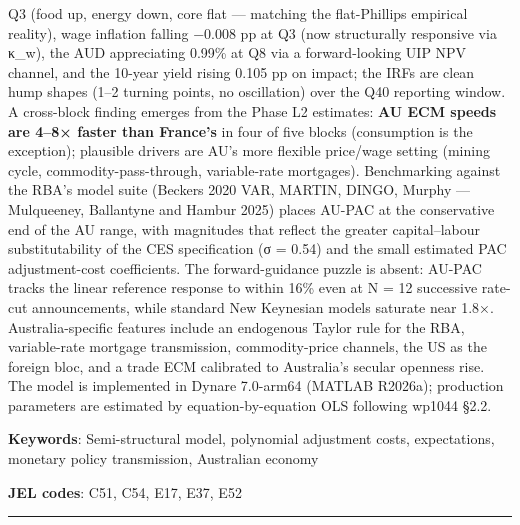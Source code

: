 \documentclass[
]{article}
\begin{document}
Q3 (food up, energy down, core flat --- matching the flat-Phillips
empirical reality), wage inflation falling −0.008 pp at Q3 (now
structurally responsive via κ\_w), the AUD appreciating 0.99\% at Q8 via
a forward-looking UIP NPV channel, and the 10-year yield rising 0.105 pp
on impact; the IRFs are clean hump shapes (1--2 turning points, no
oscillation) over the Q40 reporting window. A cross-block finding
emerges from the Phase L2 estimates: \textbf{AU ECM speeds are 4--8×
faster than France's} in four of five blocks (consumption is the
exception); plausible drivers are AU's more flexible price/wage setting
(mining cycle, commodity-pass-through, variable-rate mortgages).
Benchmarking against the RBA's model suite (Beckers 2020 VAR, MARTIN,
DINGO, Murphy --- Mulqueeney, Ballantyne and Hambur 2025) places AU-PAC
at the conservative end of the AU range, with magnitudes that reflect
the greater capital--labour substitutability of the CES specification (σ
= 0.54) and the small estimated PAC adjustment-cost coefficients. The
forward-guidance puzzle is absent: AU-PAC tracks the linear reference
response to within 16\% even at N = 12 successive rate-cut
announcements, while standard New Keynesian models saturate near 1.8×.
Australia-specific features include an endogenous Taylor rule for the
RBA, variable-rate mortgage transmission, commodity-price channels, the
US as the foreign bloc, and a trade ECM calibrated to Australia's
secular openness rise. The model is implemented in Dynare 7.0-arm64
(MATLAB R2026a); production parameters are estimated by
equation-by-equation OLS following wp1044 §2.2.

\textbf{Keywords}: Semi-structural model, polynomial adjustment costs,
expectations, monetary policy transmission, Australian economy

\textbf{JEL codes}: C51, C54, E17, E37, E52

\begin{center}\rule{0.5\linewidth}{0.5pt}\end{center}
\end{document}
